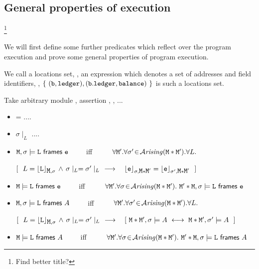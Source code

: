 \subsection{General properties of execution}\footnote{Find better title?}
\label{section:GeneralPropertiesExecution}

We will first define some further predicates which reflect over the program execution and prove
some general properties of program execution.

We call a locations set, , an expression which denotes a set of addresses and field identifiers, \eg, $\{\ (\prg{b},\prg{ledger}), (\prg{b}.\prg{ledger},\prg{balance})\ \}$ is such a locations set.

\begin{definition}[Framing]
Take arbitrary module \M, assertion \A, , ...

\begin{itemize}
\item
{} = ....
\item
$ \sigma\mid _L$ ....
\item
${\mbox{\tt{M}}}, \sigma \models {\mbox{\tt{L}}} ~{\bf{\sf {frames}}}~ {\mbox{\tt{e}}}$\ \ \ \  \ iff \ \ \ \ \
$\forall {\mbox{\tt{M}}}'.\forall \sigma'\!\in\!{\mathcal{A}}\textrm{\textit{rising}}({{\mbox{\tt{M}}}*{\mbox{\tt{M}}}'}). \forall L.$\\
\strut \hspace{1cm} $  [ \ \ L={\lfloor{ {{\mbox{\tt{L}}}}}\rfloor_{{\mbox{\tt{M}}},\sigma}}\, \wedge\,
 \sigma\mid _L= \sigma'\mid_L \ \   \longrightarrow\ \ \   {\lfloor{ {{\mbox{\tt{e}}}}}\rfloor_{\sigma,{\mbox{\tt{M}}}*{\mbox{\tt{M}}}'}}  =  {\lfloor{ {{\mbox{\tt{e}}}}}\rfloor_{\sigma',{\mbox{\tt{M}}}*{\mbox{\tt{M}}}'}}
\ \ ]$
\item
${\mbox{\tt{M}}}  \models {\mbox{\tt{L}}} ~{\bf{\sf {frames}}}~ {\mbox{\tt{e}}}$\ \ \ \  \ iff \ \ \ \ \
$\forall {\mbox{\tt{M}}}'.\forall \sigma\!\in\!{\mathcal{A}}\textrm{\textit{rising}}({{\mbox{\tt{M}}}*{\mbox{\tt{M}}}'}). \ {\mbox{\tt{M}}}'*{\mbox{\tt{M}}}, \sigma \models {\mbox{\tt{L}}} ~{\bf{\sf {frames}}}~ {\mbox{\tt{e}}}$
\item
${\mbox{\tt{M}}}, \sigma \models {\mbox{\tt{L}}} ~{\bf{\sf {frames}}}~A $\ \ \ \  \ iff \ \ \ \ \
$\forall {\mbox{\tt{M}}}'.\forall \sigma'\!\in\!{\mathcal{A}}\textrm{\textit{rising}}({{\mbox{\tt{M}}}*{\mbox{\tt{M}}}'}). \forall L.$\\
\strut \hspace{1cm} $ [ \ \ L=\interp{\prg{L}}{\M,\sigma}\, \wedge\,
\sigma\mid _L= \sigma'\mid_L \ \   \longrightarrow\ \ \   [\ \M*\M',\sigma \models \A   \ \longleftrightarrow\ \M*\M',\sigma' \models \A
\ \ ] $
\item
${\mbox{\tt{M}}}  \models {\mbox{\tt{L}}} ~{\bf{\sf {frames}}}~ A$\ \ \ \  \ iff \ \ \ \ \
$\forall {\mbox{\tt{M}}}'.\forall \sigma\!\in\!{\mathcal{A}}\textrm{\textit{rising}}({{\mbox{\tt{M}}}*{\mbox{\tt{M}}}'}). \ {\mbox{\tt{M}}}'*{\mbox{\tt{M}}}, \sigma \models {\mbox{\tt{L}}} ~{\bf{\sf {frames}}}~ A$
\end{itemize}

\end{definition}

